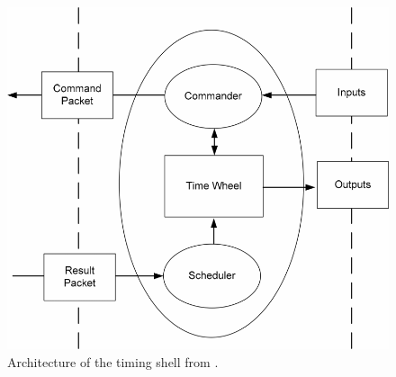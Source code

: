 \begin{figure}[htb]
    \centering
    \includegraphics[width=0.5\linewidth]{figures/timeShell.png}
    \caption{Architecture of the timing shell from \cite{chiangEfficientTwolayeredCycleaccurate2009}.}
    \label{fig:timeshell}
\end{figure}
%
%
%
%
%
